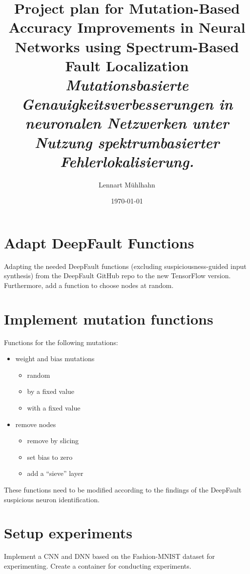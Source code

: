 \documentclass{article}
\title{Project plan for Mutation-Based Accuracy Improvements in Neural Networks using Spectrum-Based Fault Localization\\
\textit{Mutationsbasierte Genauigkeitsverbesserungen in neuronalen Netzwerken unter Nutzung spektrumbasierter Fehlerlokalisierung.}}
\author{Lennart Mühlhahn}
\date{\today}
\begin{document}
\maketitle

\section{Adapt DeepFault Functions}
Adapting the needed DeepFault functions (excluding suspiciousness-guided input synthesis) from the DeepFault GitHub repo \cite{eniser_deepfault_2019} \cite{eniser_deepfault_2023} to the new TensorFlow version. Furthermore, add a function to choose nodes at random.
\section{Implement mutation functions}
Functions for the following mutations:
\begin{itemize}
    \item weight and bias mutations
    \begin{itemize}
        \item random
        \item by a fixed value
        \item with a fixed value
    \end{itemize}
    \item remove nodes
    \begin{itemize}
        \item remove by slicing
        \item set bias to zero
        \item add a “sieve” layer
    \end{itemize}
\end{itemize}
These functions need to be modified according to the findings of the DeepFault suspicious neuron identification.
\section{Setup experiments}
Implement a CNN and DNN based on the Fashion-MNIST dataset \cite{xiao_fashion-mnist_2017} for experimenting. Create a container for conducting experiments.
\end{document}
